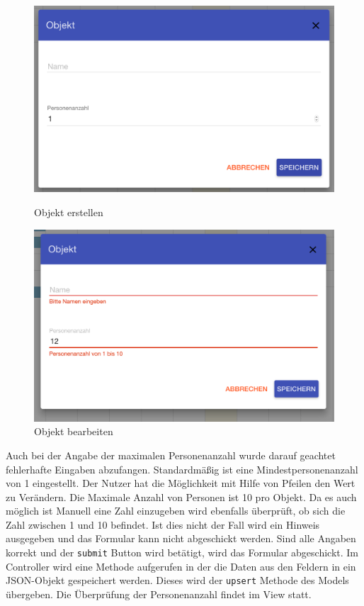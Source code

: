 \begin{figure}[H]
    \centering
    \begin{minipage}[t]{0.49\linewidth}
        \centering
        \includegraphics[width=\linewidth]{images/frontend_resource_new.png}
        \caption{Objekt erstellen}
        \label{frontend_resource_new}
    \end{minipage}
    \hfill
    \begin{minipage}[t]{0.49\linewidth}
        \centering
        \includegraphics[width=\linewidth]{images/frontend_resource_fail.png}
        \caption{Objekt bearbeiten}
		\label{frontend_resource_fail}
    \end{minipage}
\end{figure}


 Auch bei der Angabe der maximalen Personenanzahl wurde darauf geachtet fehlerhafte Eingaben abzufangen.
 Standardmäßig ist eine Mindestpersonenanzahl von 1 eingestellt. Der Nutzer hat die Möglichkeit mit Hilfe von Pfeilen den Wert zu Verändern.
 Die Maximale Anzahl von Personen ist 10 pro Objekt. Da es auch möglich ist Manuell eine Zahl einzugeben wird ebenfalls überprüft,
 ob sich die Zahl zwischen 1 und 10 befindet. Ist dies nicht der Fall wird ein Hinweis ausgegeben und das Formular kann nicht abgeschickt werden.
 Sind alle Angaben korrekt und der \texttt{submit} Button wird betätigt, wird das Formular abgeschickt. Im Controller wird eine Methode aufgerufen in
 der die Daten aus den Feldern in ein JSON-Objekt gespeichert werden. Dieses wird der \texttt{upsert} Methode des Models übergeben. Die Überprüfung der
 Personenanzahl findet im View statt.
 
